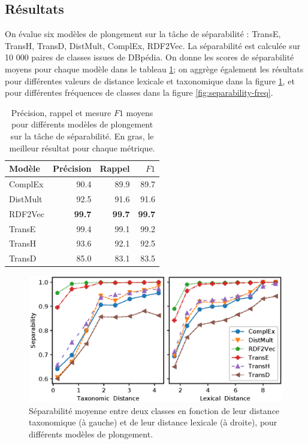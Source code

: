 \subsection{Résultats}

On évalue six modèles de plongement sur la tâche de séparabilité : TransE, TransH, TransD, DistMult, ComplEx, RDF2Vec. La séparabilité est calculée sur 10 000 paires de classes issues de DBpédia. On donne les scores de séparabilité moyens pour chaque modèle dans le tableau \ref{tab:separability-results}; on aggrège également les résultats pour différentes valeurs de distance lexicale et taxonomique dans la figure \ref{fig:separability-lexical}, et pour différentes fréquences de classes dans la figure \ref{fig:separability-freq}.


\begin{table}[]
    \centering
    \caption{Précision, rappel et mesure $F1$ moyens pour différents modèles de plongement sur la tâche de séparabilité. En gras, le meilleur résultat pour chaque métrique.}
    \begin{tabular}{|lrrr|}
    \hline 
        Modèle     & Précision  & Rappel & $F1$ \\
        \hline 
        ComplEx   &	90.4	&	89.9	&	89.7 \\
        DistMult  &	92.5	&	91.6	&	91.6 \\
        RDF2Vec   &	\textbf{99.7}	&	\textbf{99.7}	&	\textbf{99.7} \\
        TransE    &	99.4	&	99.1	&	99.2 \\
        TransH    &	93.6	&	92.1	&	92.5 \\
        TransD    &	85.0	&	83.1	&	83.5 \\
        \hline
    \end{tabular}
    \label{tab:separability-results}
\end{table}

\begin{figure}[h]
  \centering
  \includegraphics[width=\linewidth]{fig/plot/sep1_dist.eps}
  \caption{Séparabilité moyenne entre deux classes en fonction de leur distance taxonomique (à gauche) et de leur distance lexicale (à droite), pour différents modèles de plongement. }
  \label{fig:separability-lexical}
\end{figure}

